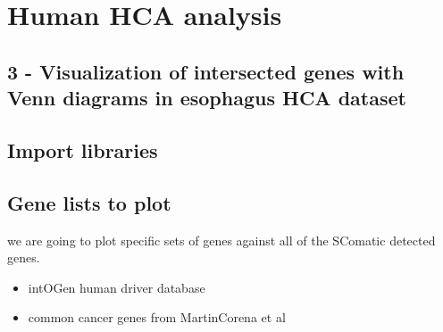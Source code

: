 \documentclass[
  letterpaper,
  DIV=11,
  numbers=noendperiod]{scrreprt}
\newenvironment{Shaded}{\begin{snugshade}}{\end{snugshade}}
\newcommand{\NormalTok}[1]{\textcolor[rgb]{0.00,0.23,0.31}{#1}}
\providecommand{\tightlist}{%
  \setlength{\itemsep}{0pt}\setlength{\parskip}{0pt}}\usepackage{longtable,booktabs,array}
\begin{document}
\part{Human HCA analysis}

\chapter{3 - Visualization of intersected genes with Venn diagrams in
esophagus HCA
dataset}\label{visualization-of-intersected-genes-with-venn-diagrams-in-esophagus-hca-dataset}

\chapter{Import libraries}\label{import-libraries-2}

\begin{Shaded}
\end{Shaded}

\chapter{Gene lists to plot}\label{gene-lists-to-plot}

we are going to plot specific sets of genes against all of the SComatic
detected genes.

\begin{itemize}
\tightlist
\item
  intOGen human driver database
\item
  common cancer genes from MartinCorena et al
\end{itemize}
\end{document}
